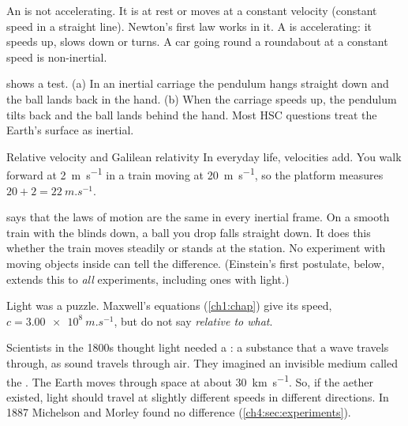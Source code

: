 \begin{sidebyside}[0.4]
  \label{ch4:fig:frames}
\nextside
  An  is not accelerating. It is at rest or moves at a
  constant velocity (constant speed in a straight line). Newton's first law works in it.
  A  is accelerating: it speeds up, slows down or turns. A car going
  round a roundabout at a constant speed is non-inertial.

   shows a test. (a) In an inertial carriage the pendulum hangs straight
  down and the ball lands back in the hand. (b) When the carriage speeds up, the pendulum tilts
  back and the ball lands behind the hand. Most HSC questions treat the Earth's surface as
  inertial.
\end{sidebyside}

\begin{refresher}{Relative velocity and Galilean relativity}
In everyday life, velocities add. You walk forward at \qty{2}{m.s^{-1}} in a train moving at
\qty{20}{m.s^{-1}}, so the platform measures $20 + 2 = \qty{22}{m.s^{-1}}$.

 says that the laws of motion are the same in every inertial frame.
On a smooth train with the blinds down, a ball you drop falls straight down. It does this whether
the train moves steadily or stands at the station. No experiment with moving objects inside can
tell the difference. (Einstein's first postulate, below, extends this to \emph{all} experiments,
including ones with light.)
\end{refresher}

Light was a puzzle. Maxwell's equations (\cref{ch1:chap}) give its speed,
$c = \qty{3.00e8}{m.s^{-1}}$, but do not say \emph{relative to what}.

Scientists in the 1800s thought light needed a : a substance that a wave travels
through, as sound travels through air. They imagined an invisible medium called the
. The Earth moves through space at about \qty{30}{km.s^{-1}}. So, if
the aether existed, light should travel at slightly different speeds in different directions.
In 1887 Michelson and Morley found no difference (\cref{ch4:sec:experiments}).

